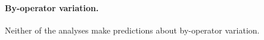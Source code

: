 \documentclass[a4paper,12pt,twoside]{article}
\begin{document}



		\paragraph{By-operator variation.} Neither of the analyses make predictions about by-operator variation.
			
\end{document}
